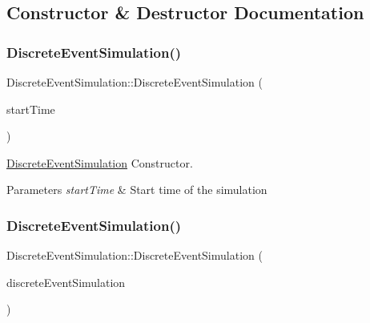 \subsection{Constructor \& Destructor Documentation}
\mbox{\label{classDiscreteEventSimulation_afef7ef964c3a7d151150120184c58d99}} 
\subsubsection{\texorpdfstring{Discrete\+Event\+Simulation()}{DiscreteEventSimulation()}\hspace{0.1cm}{\footnotesize\ttfamily [1/2]}}
{\footnotesize\ttfamily Discrete\+Event\+Simulation\+::\+Discrete\+Event\+Simulation (\begin{DoxyParamCaption}\item[{double}]{start\+Time }\end{DoxyParamCaption})\hspace{0.3cm}{\ttfamily [explicit]}}

\hyperlink{classDiscreteEventSimulation}{Discrete\+Event\+Simulation} Constructor. 
\begin{DoxyParams}{Parameters}
{\em start\+Time} & Start time of the simulation \\
\hline
\end{DoxyParams}
\mbox{\label{classDiscreteEventSimulation_aa92e10279fe95449f35139a4893192f5}} 
\subsubsection{\texorpdfstring{Discrete\+Event\+Simulation()}{DiscreteEventSimulation()}\hspace{0.1cm}{\footnotesize\ttfamily [2/2]}}
{\footnotesize\ttfamily Discrete\+Event\+Simulation\+::\+Discrete\+Event\+Simulation (\begin{DoxyParamCaption}\item[{const \hyperlink{classDiscreteEventSimulation}{Discrete\+Event\+Simulation} \&}]{discrete\+Event\+Simulation }\end{DoxyParamCaption})}

